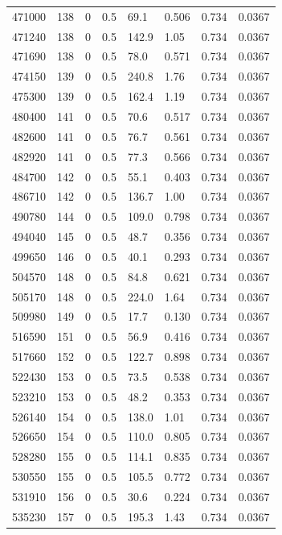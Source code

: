 \documentclass[preview]{standalone}
\begin{document}
{{{{{{{{{{\begin{tabular}{L{1.2cm}C{1.2cm} C{0.3cm}C{0.5cm} C{1.4cm}C{1.4cm} C{1.4cm}C{1.4cm}}
  471000  &   138  & 0     & 0.5 &  69.1  & 0.506  & 0.734 &  0.0367   \\ 
  471240  &   138  & 0     & 0.5 &  142.9  & 1.05  & 0.734 &  0.0367   \\ 
  471690  &   138  & 0     & 0.5 &  78.0  & 0.571  & 0.734 &  0.0367   \\ 
  474150  &   139  & 0     & 0.5 &  240.8  & 1.76  & 0.734 &  0.0367   \\ 
  475300  &   139  & 0     & 0.5 &  162.4  & 1.19  & 0.734 &  0.0367   \\ 
  480400  &   141  & 0     & 0.5 &  70.6  & 0.517  & 0.734 &  0.0367   \\ 
  482600  &   141  & 0     & 0.5 &  76.7  & 0.561  & 0.734 &  0.0367   \\ 
  482920  &   141  & 0     & 0.5 &  77.3  & 0.566  & 0.734 &  0.0367   \\ 
  484700  &   142  & 0     & 0.5 &  55.1  & 0.403  & 0.734 &  0.0367   \\ 
  486710  &   142  & 0     & 0.5 &  136.7  & 1.00  & 0.734 &  0.0367   \\ 
  490780  &   144  & 0     & 0.5 &  109.0  & 0.798  & 0.734 &  0.0367   \\ 
  494040  &   145  & 0     & 0.5 &  48.7  & 0.356  & 0.734 &  0.0367   \\ 
  499650  &   146  & 0     & 0.5 &  40.1  & 0.293  & 0.734 &  0.0367   \\ 
  504570  &   148  & 0     & 0.5 &  84.8  & 0.621  & 0.734 &  0.0367   \\ 
  505170  &   148  & 0     & 0.5 &  224.0  & 1.64  & 0.734 &  0.0367   \\ 
  509980  &   149  & 0     & 0.5 &  17.7  & 0.130  & 0.734 &  0.0367   \\ 
  516590  &   151  & 0     & 0.5 &  56.9  & 0.416  & 0.734 &  0.0367   \\ 
  517660  &   152  & 0     & 0.5 &  122.7  & 0.898  & 0.734 &  0.0367   \\ 
  522430  &   153  & 0     & 0.5 &  73.5  & 0.538  & 0.734 &  0.0367   \\ 
  523210  &   153  & 0     & 0.5 &  48.2  & 0.353  & 0.734 &  0.0367   \\ 
  526140  &   154  & 0     & 0.5 &  138.0  & 1.01  & 0.734 &  0.0367   \\ 
  526650  &   154  & 0     & 0.5 &  110.0  & 0.805  & 0.734 &  0.0367   \\ 
  528280  &   155  & 0     & 0.5 &  114.1  & 0.835  & 0.734 &  0.0367   \\ 
  530550  &   155  & 0     & 0.5 &  105.5  & 0.772  & 0.734 &  0.0367   \\ 
  531910  &   156  & 0     & 0.5 &  30.6  & 0.224  & 0.734 &  0.0367   \\ 
  535230  &   157  & 0     & 0.5 &  195.3  & 1.43  & 0.734 &  0.0367   \\ 
\hline 
\end{tabular} 

}}}}}}}}}}
\end{document}
